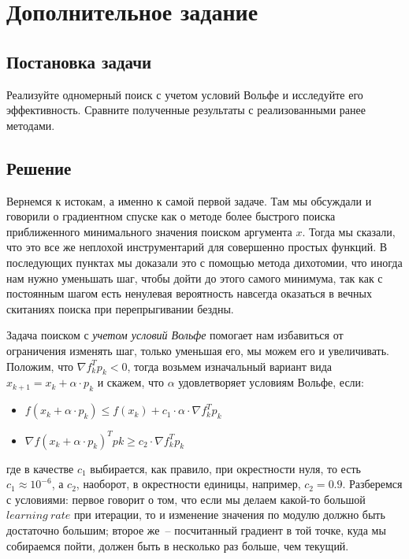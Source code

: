 \documentclass[12pt, a4paper, oneside, final]{article}
\begin{document}
	\section*{Дополнительное задание}
	\subsection*{Постановка задачи}
	Реализуйте одномерный поиск с учетом условий Вольфе и исследуйте его эффективность. Сравните полученные результаты с реализованными ранее методами.
	\subsection*{Решение}
	Вернемся к истокам, а именно к самой первой задаче. Там мы обсуждали и говорили о градиентном спуске как о методе более быстрого поиска приближенного минимального значения поиском аргумента $x$. Тогда мы сказали, что это все же неплохой инструментарий для совершенно простых функций. В последующих пунктах мы доказали это с помощью метода дихотомии, что иногда нам нужно уменьшать шаг, чтобы дойти до этого самого минимума, так как с постоянным шагом есть ненулевая вероятность навсегда оказаться в вечных скитаниях поиска при перепрыгивании бездны.

	Задача поиском с \textit{учетом условий Вольфе} помогает нам избавиться от ограничения изменять шаг, только уменьшая его, мы можем его и увеличивать. Положим, что $\nabla{f^{T}_{k}p_{k}} < 0$, тогда возьмем изначальный вариант вида $x_{k + 1} = x_{k} + \alpha \cdot p_{k}$ и скажем, что $\alpha$ удовлетворяет условиям Вольфе, если:
	\begin{itemize}
		\item $f(x_{k} + \alpha \cdot p_{k}) \leqslant f(x_{k}) + c_{1} \cdot \alpha \cdot \nabla{f^{T}_{k}p_{k}}$
		\item $\nabla{f(x_{k} + \alpha \cdot p_{k})^{T}p{k}} \geqslant c_{2} \cdot \nabla{f^{T}_{k}p_{k}}$
	\end{itemize}
	где в качестве $c_{1}$ выбирается, как правило, при окрестности нуля, то есть $c_{1} \approx 10^{-6}$, а $c_{2}$, наоборот, в окрестности единицы, например, $c_{2} = 0.9$. Разберемся с условиями: первое говорит о том, что если мы делаем какой-то большой $learning~rate$ при итерации, то и изменение значения по модулю должно быть достаточно большим; второе же~-- посчитанный градиент в той точке, куда мы собираемся пойти, должен быть в несколько раз больше, чем текущий.
\end{document}
